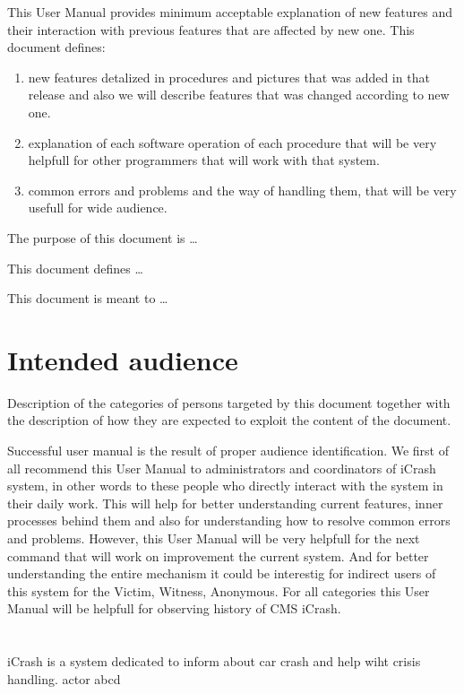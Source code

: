 This User Manual provides minimum acceptable explanation of new
features and their interaction with previous features that are affected by new
one. This document defines:
\begin{enumerate}
  \item new features detalized in procedures and pictures that
was added in that release and also we will describe features that was changed according to new one. 
\item explanation of each software operation of each procedure that will be very helpfull for other programmers that will work with that system.
\item common errors and problems and the way of handling them, that
will be very usefull for wide audience. 
\end{enumerate} 


The purpose of this document is \ldots

This document defines \ldots

This document is meant to \ldots



\section{Intended audience}
Description of the categories of persons targeted by this document together with
the description of how they are expected to exploit the content of the document.

Successful user manual is the result of proper audience identification. We first
of all recommend this User Manual to administrators and coordinators of iCrash
system, in other words to these people who directly interact with the
system in their daily work. This will help for better understanding current
features, inner processes behind them and also for understanding how to resolve common errors
and problems. However, this User Manual will be very helpfull for the next command that will
work on improvement the current system. And for better understanding the entire mechanism it could be interestig for indirect users of this system for the Victim, Witness, Anonymous.
For all categories this User Manual will be helpfull for observing history of
CMS iCrash. 


\section{\mysystemname}
iCrash is a system dedicated to inform about car crash and help wiht crisis
handling. \gls{actor} abcd 


